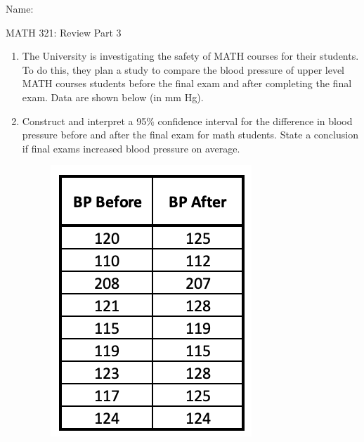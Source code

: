 \documentclass{article}
\begin{document}
\hspace{375pt}Name:

\begin{center}
{\Huge MATH 321: Review Part 3}

\end{center}

\bigskip\bigskip



\begin{enumerate}
    \item The University is investigating the safety of MATH courses for their students. To do this, they plan a study to compare the blood pressure of upper level MATH courses students before the final exam and after completing the final exam. Data are shown below (in mm Hg).%
    \item[] Construct and interpret a 95\% confidence interval for the difference in blood pressure before and after the final exam for math students. State a conclusion if final exams increased blood pressure on average.
    \begin{figure}[H]
        \includegraphics[scale=0.5]{images/data-bp.png}
    \end{figure}\vspace{100pt}
        

\end{enumerate}
\end{document}

